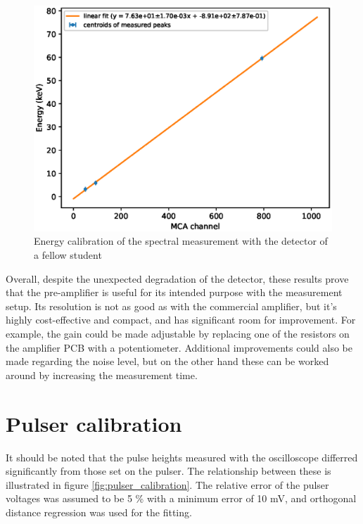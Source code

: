 \documentclass[a4paper]{article}
\begin{document}
\begin{appendices}
\clearpage
\begin{figure}[ht!]
\centering
\includegraphics[width=\textwidth]{fig/python/spectral_calibration_custom_preamp_Nikitas_detector.eps}
\caption{Energy calibration of the spectral measurement with the detector of a fellow student}
\label{fig:spectral_calibration_nikita}
\end{figure}

\FloatBarrier
Overall, despite the unexpected degradation of the detector, these results prove that the pre-amplifier is useful for its intended purpose with the measurement setup.
Its resolution is not as good as with the commercial amplifier, but it's highly cost-effective and compact, and has significant room for improvement.
For example, the gain could be made adjustable by replacing one of the resistors on the amplifier PCB with a potentiometer.
Additional improvements could also be made regarding the noise level, but on the other hand these can be worked around by increasing the measurement time.



\clearpage
\section{Pulser calibration}
\label{pulser_calibration}
It should be noted that the pulse heights measured with the oscilloscope differred significantly from those set on the pulser.
The relationship between these is illustrated in figure \ref{fig:pulser_calibration}.
The relative error of the pulser voltages was assumed to be 5 \% with a minimum error of 10 mV, and orthogonal distance regression was used for the fitting.


\end{appendices}
\end{document}
